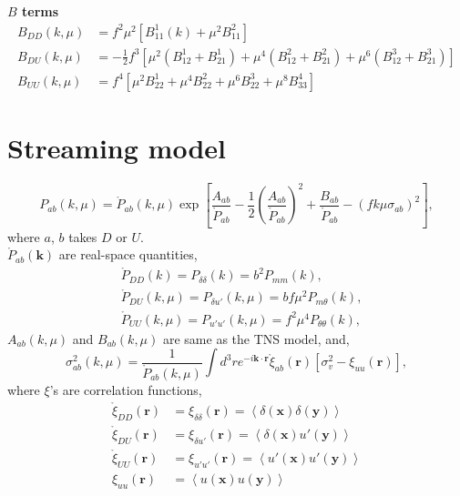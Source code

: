 \documentclass[a4paper,11pt, fleqn]{article}
\begin{document}
\textbf{$B$ terms}\vspace{-2mm}
\begin{align}
  B_{DD}(k, \mu) &= f^2 \mu^2 \left[ B^1_{11}(k) + \mu^2 B^2_{11} \right]\\
  B_{DU}(k, \mu) &= -\frac{1}{2} f^3 \left[
    \mu^2( B^1_{12} + B^1_{21} ) + \mu^4(B^2_{12} + B^2_{21})
    + \mu^6(B^3_{12} + B^3_{21}) \right]\\
  B_{UU}(k, \mu) &= f^4 \left[ \mu^2 B^1_{22} + \mu^4 B^2_{22} + \mu^6
    B^3_{22} + \mu^8 B^4_{33}\right]
\end{align}

%
%
\newpage
\section{Streaming model}
\vspace{-5mm}

\begin{equation}
  P_{ab}(k, \mu) = \mathring{P}_{ab}(k, \mu) \exp \left[
    \frac{A_{ab}}{\mathring{P}_{ab}}
    - \frac{1}{2} \left( \frac{A_{ab}}{\mathring{P}_{ab}} \right)^2
    + \frac{B_{ab}}{\mathring{P}_{ab}} - (f k \mu \sigma_{ab})^2
    \right],
\end{equation}
%
where $a$, $b$ takes $D$ or $U$.\\

$\mathring{P}_{ab}(\bm{k})$ are real-space quantities,
\begin{align}
  &\mathring{P}_{DD}(k) = P_{\delta\delta}(k) = b^2 P_{mm}(k),\\
  &\mathring{P}_{DU}(k, \mu) = P_{\delta u'}(k, \mu) = b f\mu^2 P_{m\theta}(k),\\
  &\mathring{P}_{UU}(k, \mu) = P_{u'u'}(k, \mu) = f^2\mu^4 P_{\theta\theta}(k),
\end{align}
$A_{ab}(k, \mu)$ and $B_{ab}(k, \mu)$ are same as the TNS model, and,
%
\begin{equation}
  \sigma_{ab}^2(k, \mu) = \frac{1}{\mathring{P}_{ab}(k, \mu)}
  \int \! d^3 r e^{-i\bm{k}\cdot\bm{r}} 
  \mathring{\xi}_{ab}(\bm{r}) \left[ \sigma^2_v - \xi_{uu}(\bm{r}) \right],
\end{equation}
%
where $\xi$'s are correlation functions,
%
\begin{align}
  \mathring{\xi}_{DD}(\bm{r}) &= \xi_{\delta\delta}(\bm{r}) = \left\langle
  \delta(\bm{x}) \delta(\bm{y}) \right\rangle\\
  \mathring{\xi}_{DU}(\bm{r}) &= \xi_{\delta u'}(\bm{r}) = \left\langle
  \delta(\bm{x}) u'(\bm{y}) \right\rangle\\
  \mathring{\xi}_{UU}(\bm{r}) &= \xi_{u'u'}(\bm{r}) = \left\langle
  u'(\bm{x}) u'(\bm{y}) \right\rangle\\
  \xi_{uu}(\bm{r}) &= \left\langle
  u(\bm{x}) u(\bm{y}) \right\rangle\\
\end{align}
  
\end{document}
